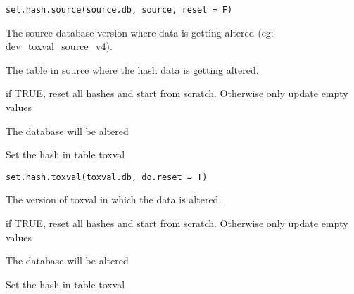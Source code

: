 \documentclass[letterpaper]{book}
\begin{document}
%
\begin{Usage}
\begin{verbatim}
set.hash.source(source.db, source, reset = F)
\end{verbatim}
\end{Usage}
%
\begin{Arguments}
\begin{ldescription}
\item[\code{source.db}] The source database version where data is getting altered (eg: dev\_toxval\_source\_v4).

\item[\code{source}] The table in source where the hash data is getting altered.

\item[\code{do.reset}] if TRUE, reset all hashes and start from scratch.
Otherwise only update empty values
\end{ldescription}
\end{Arguments}
%
\begin{Value}
The database will be altered
\end{Value}
%
\begin{Description}\relax
Set the hash in table toxval
\end{Description}
%
\begin{Usage}
\begin{verbatim}
set.hash.toxval(toxval.db, do.reset = T)
\end{verbatim}
\end{Usage}
%
\begin{Arguments}
\begin{ldescription}
\item[\code{toxval.db}] The version of toxval in which the data is altered.

\item[\code{do.reset}] if TRUE, reset all hashes and start from scratch.
Otherwise only update empty values
\end{ldescription}
\end{Arguments}
%
\begin{Value}
The database will be altered
\end{Value}
%
\begin{Description}\relax
Set the hash in table toxval
\end{Description}
\end{document}
